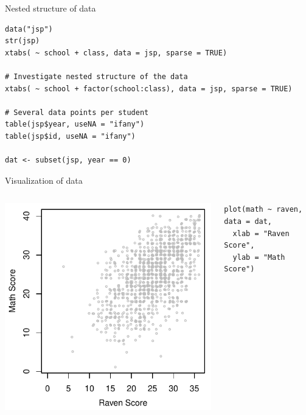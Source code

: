 \documentclass[aspectratio=169]{beamer}
\begin{document}
\begin{frame}[fragile]{Nested structure of data}
  \begin{lstlisting}
data("jsp")
str(jsp)
xtabs( ~ school + class, data = jsp, sparse = TRUE)

# Investigate nested structure of the data
xtabs( ~ school + factor(school:class), data = jsp, sparse = TRUE)

# Several data points per student
table(jsp$year, useNA = "ifany")
table(jsp$id, useNA = "ifany")

dat <- subset(jsp, year == 0)
  \end{lstlisting}
\end{frame}

\begin{frame}[fragile]{Visualization of data}
  \begin{columns}
    \begin{column}{.5\textwidth}
      \includegraphics[scale=.8]{../figures/jsp_scatter}
    \end{column}
    \begin{column}{.5\textwidth}
      \begin{lstlisting}
plot(math ~ raven, data = dat,
  xlab = "Raven Score",
  ylab = "Math Score")
      \end{lstlisting}
    \end{column}
  \end{columns}
\end{frame}
\end{document}
